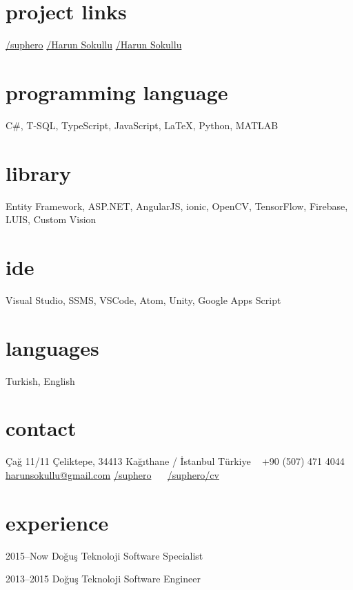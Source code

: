 \documentclass[]{../friggeri-cv} %
\begin{document}

\begin{aside}
\section{project links}
\href{https://github.com/suphero}{\faGithub/suphero}
\href{https://play.google.com/store/apps/developer?id=Harun+Sokullu}{\faAndroid/Harun Sokullu}
\href{https://itunes.apple.com/tr/developer/harun-sokullu/id1265151811}{\faApple/Harun Sokullu}
\section{programming language}
C\#, T-SQL, TypeScript, JavaScript, \LaTeX, Python, MATLAB
\section{library}
Entity Framework, ASP.NET, AngularJS, ionic, OpenCV, TensorFlow, Firebase, LUIS, Custom Vision
\section{ide}
Visual Studio, SSMS, VSCode, Atom, Unity, Google Apps Script
\section{languages}
Turkish, English
\section{contact}
Çağ 11/11
Çeliktepe, 34413
Kağıthane / İstanbul
Türkiye
~
+90 (507) 471 4044
~
\href{mailto:harunsokullu@gmail.com}{harunsokullu@gmail.com}
\href{https://www.linkedin.com/in/suphero}{\faLinkedin/suphero}
~~
\href{https://github.com/suphero/cv/raw/master/English/Harun\%20Sokullu.pdf}{\faGithub/suphero/cv}
\end{aside}

\section{experience}

\begin{entrylist}

\entry
{2015--Now}
{Doğuş Teknoloji}{}
{Software Specialist}

\entry
{2013--2015}
{Doğuş Teknoloji}{}
{Software Engineer}

\end{entrylist}
\end{document}
